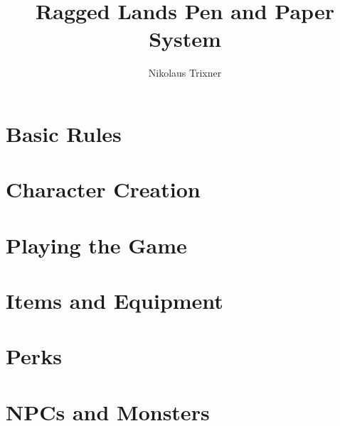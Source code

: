 \documentclass{report}
\begin{document}
	\title{Ragged Lands Pen and Paper System}
	\author{Nikolaus Trixner}
		
	\maketitle
	
	\tableofcontents

%	
%	

\part{Basic Rules}
	
\newpage

\part{Character Creation}
	
	
	
%	
%	
\newpage

\part{Playing the Game}
	
	
	
	
\newpage

\part{Items and Equipment}
	
	
	
\newpage

\part{Perks}
	
	
	
	
	
	
	
\newpage

\part{NPCs and Monsters}
	
\newpage

\begin{appendices}
	
	
	
\newpage

\end{appendices}
\end{document}
